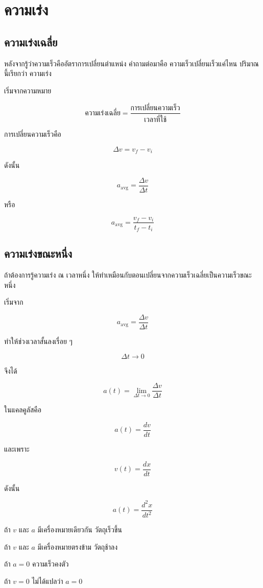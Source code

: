 \documentclass[12pt,a4paper]{report}
\begin{document}
\section{ความเร่ง}

\subsection{ความเร่งเฉลี่ย}

หลังจากรู้ว่าความเร็วคืออัตราการเปลี่ยนตำแหน่ง คำถามต่อมาคือ ความเร็วเปลี่ยนเร็วแค่ไหน ปริมาณนี้เรียกว่า ความเร่ง

เริ่มจากความหมาย

\[
\text{ความเร่งเฉลี่ย}=\frac{\text{การเปลี่ยนความเร็ว}}{\text{เวลาที่ใช้}}
\]

การเปลี่ยนความเร็วคือ

\[
\Delta v=v_f-v_i
\]

ดังนั้น

\[
a_{\text{avg}}=\frac{\Delta v}{\Delta t}
\]

หรือ

\[
a_{\text{avg}}=\frac{v_f-v_i}{t_f-t_i}
\]

\subsection{ความเร่งขณะหนึ่ง}

ถ้าต้องการรู้ความเร่ง ณ เวลาหนึ่ง ให้ทำเหมือนกับตอนเปลี่ยนจากความเร็วเฉลี่ยเป็นความเร็วขณะหนึ่ง

เริ่มจาก

\[
a_{\text{avg}}=\frac{\Delta v}{\Delta t}
\]

ทำให้ช่วงเวลาสั้นลงเรื่อย ๆ

\[
\Delta t\to 0
\]

จึงได้

\[
a(t)=\lim_{\Delta t\to 0}\frac{\Delta v}{\Delta t}
\]

ในแคลคูลัสคือ

\[
a(t)=\frac{dv}{dt}
\]

และเพราะ

\[
v(t)=\frac{dx}{dt}
\]

ดังนั้น

\[
a(t)=\frac{d^2x}{dt^2}
\]

\begin{tcolorbox}[title=กฎจำง่าย]
ถ้า $v$ และ $a$ มีเครื่องหมายเดียวกัน วัตถุเร็วขึ้น

ถ้า $v$ และ $a$ มีเครื่องหมายตรงข้าม วัตถุช้าลง

ถ้า $a=0$ ความเร็วคงตัว

ถ้า $v=0$ ไม่ได้แปลว่า $a=0$
\end{tcolorbox}
\end{document}
